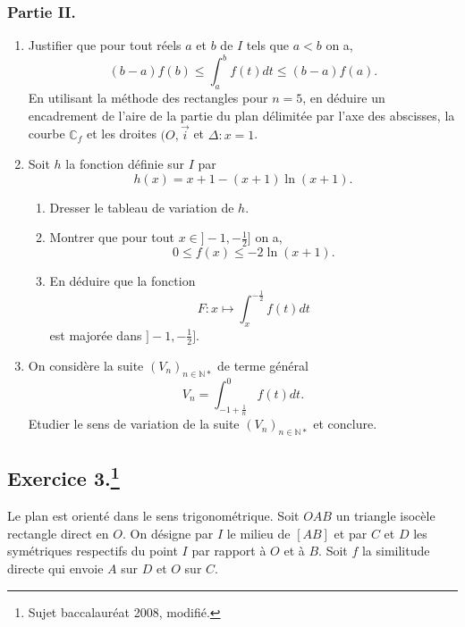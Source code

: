 \documentclass[a4paper]{article}
\begin{document}
\subsubsection*{Partie II.}
\begin{enumerate}
	\item Justifier que pour tout réels $a$ et $b$ de $I$ tels que $a<b$ on a, \[
			(b-a)f(b)\leq\int_a^bf(t)dt\leq(b-a)f(a)
	.\] 
	En utilisant la méthode des rectangles pour $n=5$, en déduire un encadrement de l'aire de la partie du plan délimitée par l'axe des abscisses, la courbe $\mathbb{C}_f$ et les droites $(O,\vec{i}$ et $\Delta:x=1$.\\
	\item Soit $h$ la fonction définie sur $I$ par \[
			h(x)=x+1-(x+1)\ln(x+1)
	.\] 
	\begin{enumerate}[label=(\alph*)]
		\item Dresser le tableau de variation de $h$.
		\item Montrer que pour tout $x\in]-1,-\frac{1}{2}]$ on a, \[
				0\leq f(x)\leq-2\ln(x+1)
		.\] 
	\item En déduire que la fonction \[
			F:x\mapsto\int_x^{-\frac{1}{2}}f(t)dt\] 
			est majorée dans $]-1,-\frac{1}{2}]$.
	\end{enumerate}
\item	On considère la suite $(V_n)_{n\in\mathbb{N}*}$ de terme général \[
		V_n=\int_{-1+\frac{1}{n}}^0f(t)dt
.\] 
Etudier le sens de variation de la suite $(V_n)_{n\in\mathbb{N}*}$ et conclure.
\end{enumerate}
\newpage
\subsection*{Exercice 3.\footnote{Sujet baccalauréat 2008, modifié.}}
Le plan est orienté dans le sens trigonométrique. Soit $OAB$ un triangle isocèle rectangle direct en $O$. On désigne par $I$ le milieu de $[AB]$ et par $C$ et $D$ les symétriques respectifs du point $I$ par rapport à $O$ et à $B$. Soit $f$ la similitude directe qui envoie $A$ sur $D$ et $O$ sur $C$.
\end{document}
